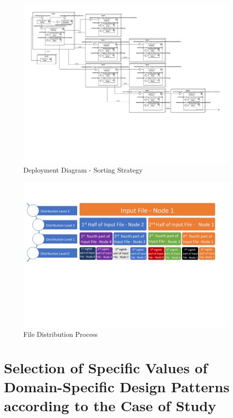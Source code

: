 \begin{landscape}
	\begin{figure}[p!]
		\centering
		\includegraphics[trim=2cm 6cm 1cm 1cm]{fig/JCMunozDiagrams.pdf}
		\caption{Deployment Diagram - Sorting Strategy}
		\label{fig:diagramJCMunoz}
	\end{figure}	
\end{landscape}

\begin{figure}
	\centering
	\includegraphics[trim=0cm 8cm 1cm 3cm, scale=0.6]{fig/FileProccess.pdf}
	\caption{File Distribution Process}
	\label{fig:fileProcess}
\end{figure}

\section{Selection of Specific Values of Domain-Specific Design Patterns according to the Case of Study}
\label{sec:selectdesignpatterns}

